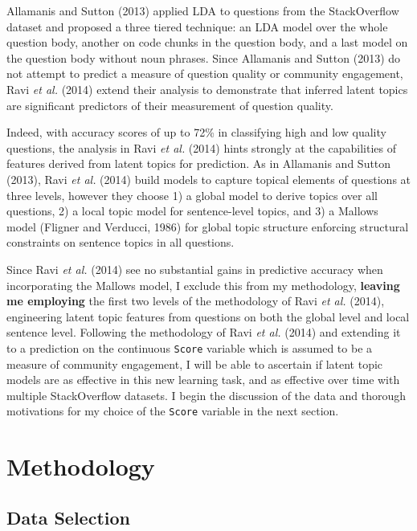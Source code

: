 \documentclass[11pt,preprint, authoryear]{article}
\numberwithin{equation}{section}
\begin{document}
Allamanis and Sutton (2013) applied LDA to questions from the
StackOverflow dataset and proposed a three tiered technique: an LDA
model over the whole question body, another on code chunks in the
question body, and a last model on the question body without noun
phrases. Since Allamanis and Sutton (2013) do not attempt to predict a
measure of question quality or community engagement, Ravi \emph{et al.}
(2014) extend their analysis to demonstrate that inferred latent topics
are significant predictors of their measurement of question quality.

Indeed, with accuracy scores of up to 72\% in classifying high and low
quality questions, the analysis in Ravi \emph{et al.} (2014) hints
strongly at the capabilities of features derived from latent topics for
prediction. As in Allamanis and Sutton (2013), Ravi \emph{et al.} (2014)
build models to capture topical elements of questions at three levels,
however they choose 1) a global model to derive topics over all
questions, 2) a local topic model for sentence-level topics, and 3) a
Mallows model (Fligner and Verducci, 1986) for global topic structure
enforcing structural constraints on sentence topics in all questions.

Since Ravi \emph{et al.} (2014) see no substantial gains in predictive
accuracy when incorporating the Mallows model, I exclude this from my
methodology, \textbf{leaving me employing} the first two levels of the
methodology of Ravi \emph{et al.} (2014), engineering latent topic
features from questions on both the global level and local sentence
level. Following the methodology of Ravi \emph{et al.} (2014) and
extending it to a prediction on the continuous \texttt{Score} variable
which is assumed to be a measure of community engagement, I will be able
to ascertain if latent topic models are as effective in this new
learning task, and as effective over time with multiple StackOverflow
datasets. I begin the discussion of the data and thorough motivations
for my choice of the \texttt{Score} variable in the next section.

\newpage

\section{\texorpdfstring{Methodology
\label{Method}}{Methodology }}\label{methodology}

\subsection{\texorpdfstring{Data Selection
\label{Data}}{Data Selection }}\label{data-selection}
\end{document}
